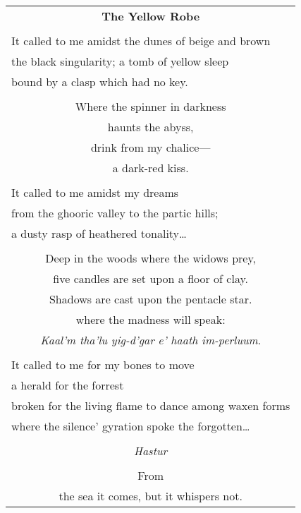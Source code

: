 \documentclass{article}
\begin{document}
\newcommand{\h}{\hspace*{4ex}}

\begin{center}
\begin{tabular}{l}
\multicolumn{1}{c}{\large\textbf{The Yellow Robe}} \\
\\
It called to me amidst the dunes of beige and brown \\
the black singularity; a tomb of yellow sleep \\
bound by a clasp which had no key. \\
\\
\multicolumn{1}{c}{Where the spinner in darkness} \\
\multicolumn{1}{c}{haunts the abyss,} \\
\multicolumn{1}{c}{drink from my chalice---} \\
\multicolumn{1}{c}{a dark-red kiss.} \\
\\
It called to me amidst my dreams \\
from the ghooric valley to the partic hills; \\
a dusty rasp of heathered tonality\ldots{} \\
\\
\multicolumn{1}{c}{Deep in the woods where the widows prey,} \\
\multicolumn{1}{c}{five candles are set upon a floor of clay.} \\
\multicolumn{1}{c}{Shadows are cast upon the pentacle star.} \\
\multicolumn{1}{c}{where the madness will speak:} \\
\multicolumn{1}{c}{
	\textit{Kaal'm tha'lu yig-d'gar} %
	\textit{e' haath im-perluum}.    %
} \\ %
\\
It called to me for my bones to move \\
a herald for the forrest \\
broken for the living flame to dance among waxen forms \\
where the silence' gyration spoke the forgotten\ldots{} \\
\\
\multicolumn{1}{c}{\textit{Hastur}} \\
\\
\multicolumn{1}{c}{From} \\
\multicolumn{1}{c}{the sea it comes, but it whispers not.} \\

\end{tabular}
\end{center}
\end{document}

